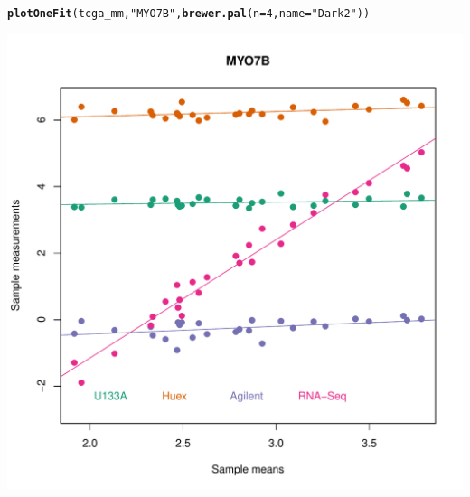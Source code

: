 \documentclass{article}\usepackage[]{graphicx}\usepackage[]{color}
\makeatletter
\def\maxwidth{ %
  \ifdim\Gin@nat@width>\linewidth
    \linewidth
  \else
    \Gin@nat@width
  \fi
}
\newcommand{\hlnum}[1]{\textcolor[rgb]{0.686,0.059,0.569}{#1}}%
\newcommand{\hlstr}[1]{\textcolor[rgb]{0.192,0.494,0.8}{#1}}%
\newcommand{\hlstd}[1]{\textcolor[rgb]{0.345,0.345,0.345}{#1}}%
\newcommand{\hlkwc}[1]{\textcolor[rgb]{0.333,0.667,0.333}{#1}}%
\newcommand{\hlkwd}[1]{\textcolor[rgb]{0.737,0.353,0.396}{\textbf{#1}}}%
\newenvironment{kframe}{%
 \def\at@end@of@kframe{}%
 \ifinner\ifhmode%
  \def\at@end@of@kframe{\end{minipage}}%
  \begin{minipage}{\columnwidth}%
 \fi\fi%
 \def\FrameCommand##1{\hskip\@totalleftmargin \hskip-\fboxsep
 \colorbox{shadecolor}{##1}\hskip-\fboxsep
     \hskip-\linewidth \hskip-\@totalleftmargin \hskip\columnwidth}%
 \MakeFramed {\advance\hsize-\width
   \@totalleftmargin\z@ \linewidth\hsize
   \@setminipage}}%
 {\par\unskip\endMakeFramed%
 \at@end@of@kframe}
\newenvironment{knitrout}{}{} %
\makeatother
\begin{document}
\begin{knitrout}
\color{fgcolor}\begin{kframe}
\begin{alltt}
\hlkwd{plotOneFit}\hlstd{(tcga_mm,} \hlstr{"MYO7B"}\hlstd{,} \hlkwd{brewer.pal}\hlstd{(}\hlkwc{n} \hlstd{=} \hlnum{4}\hlstd{,} \hlkwc{name} \hlstd{=} \hlstr{"Dark2"}\hlstd{))}
\end{alltt}
\end{kframe}
\includegraphics[width=\maxwidth]{figure/my07b-1} 

\end{knitrout}
\end{document}
